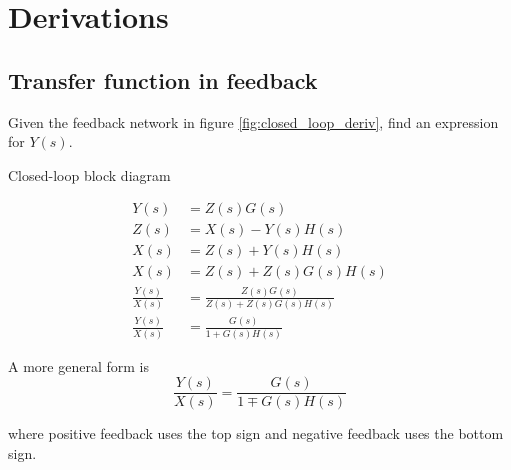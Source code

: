 
\chapter{Derivations}

\section{Transfer function in feedback}
\label{sec:deriv_tf_feedback}

Given the feedback network in figure \ref{fig:closed_loop_deriv}, find an
expression for $Y(s)$.
\begin{bookfigure}

  \caption{Closed-loop block diagram}
  \label{fig:closed_loop_deriv}
\end{bookfigure}
\begin{align}
  Y(s) &= Z(s) G(s) \nonumber \\
  Z(s) &= X(s) - Y(s) H(s) \nonumber \\
  X(s) &= Z(s) + Y(s) H(s) \nonumber \\
  X(s) &= Z(s) + Z(s) G(s) H(s) \nonumber \\
  \frac{Y(s)}{X(s)} &= \frac{Z(s) G(s)}{Z(s) + Z(s) G(s) H(s)} \nonumber \\
  \frac{Y(s)}{X(s)} &= \frac{G(s)}{1 + G(s) H(s)}
\end{align}

A more general form is
\begin{equation}
  \frac{Y(s)}{X(s)} = \frac{G(s)}{1 \mp G(s) H(s)}
\end{equation}

where positive feedback uses the top sign and negative feedback uses the bottom
sign.

